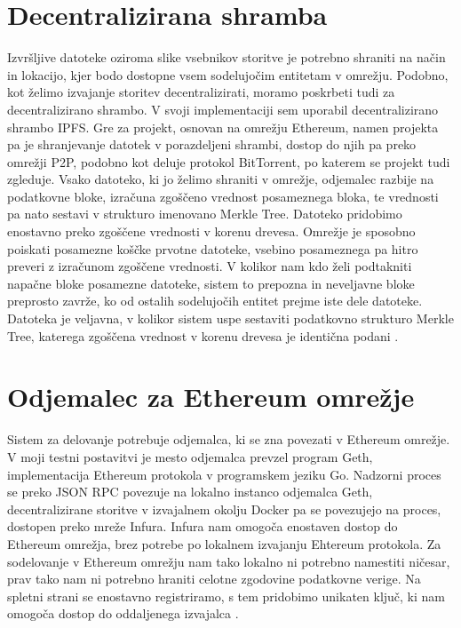 \documentclass[a4paper, 12pt]{book}
\begin{document}
\section{Decentralizirana shramba}
Izvršljive datoteke oziroma slike vsebnikov storitve je potrebno shraniti na način in lokacijo, kjer bodo dostopne vsem sodelujočim entitetam v omrežju.
Podobno, kot želimo izvajanje storitev decentralizirati, moramo poskrbeti tudi za decentralizirano shrambo.
V svoji implementaciji sem uporabil decentralizirano shrambo IPFS.
Gre za projekt, osnovan na omrežju Ethereum, namen projekta pa je shranjevanje datotek v porazdeljeni shrambi, dostop do njih pa preko omrežji P2P, podobno kot deluje protokol BitTorrent, po katerem se projekt tudi zgleduje.
Vsako datoteko, ki jo želimo shraniti v omrežje, odjemalec razbije na podatkovne bloke, izračuna zgoščeno vrednost posameznega bloka, te vrednosti pa nato sestavi v strukturo imenovano Merkle Tree.
Datoteko pridobimo enostavno preko zgoščene vrednosti v korenu drevesa.
Omrežje je sposobno poiskati posamezne koščke prvotne datoteke, vsebino posameznega pa hitro preveri z izračunom zgoščene vrednosti. V kolikor nam kdo želi podtakniti napačne bloke posamezne datoteke, sistem to prepozna in neveljavne bloke preprosto zavrže, ko od ostalih sodelujočih entitet prejme iste dele datoteke. Datoteka je veljavna, v kolikor sistem uspe sestaviti podatkovno strukturo Merkle Tree, katerega zgoščena vrednost v korenu drevesa je identična podani \cite{Ipfs}.

\section{Odjemalec za Ethereum omrežje}
Sistem za delovanje potrebuje odjemalca, ki se zna povezati v Ethereum omrežje.
V moji testni postavitvi je mesto odjemalca prevzel program Geth, implementacija Ethereum protokola v programskem jeziku Go. \cite{Geth}
Nadzorni proces se preko JSON RPC povezuje na lokalno instanco odjemalca Geth, decentralizirane storitve v izvajalnem okolju Docker pa se 
povezujejo na proces, dostopen preko mreže Infura.
Infura nam omogoča enostaven dostop do Ethereum omrežja, brez potrebe po lokalnem izvajanju Ehtereum protokola.
Za sodelovanje v Ethereum omrežju nam tako lokalno ni potrebno namestiti ničesar, prav tako nam ni potrebno hraniti
celotne zgodovine podatkovne verige. 
Na spletni strani se enostavno registriramo, s tem pridobimo unikaten ključ, ki nam omogoča dostop do oddaljenega izvajalca \cite{Infura}.
\end{document}
